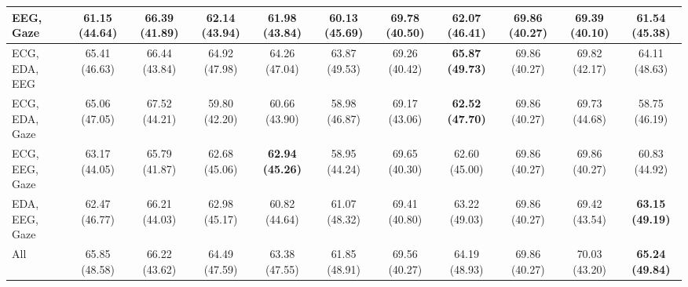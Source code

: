 \begin{table}[!htbp]
\begin{tabular}{lcccccccccc}
    EEG, Gaze & 61.15 (44.64) & 66.39 (41.89) & 62.14 (43.94) & 61.98 (43.84) & 60.13 (45.69) & 69.78 (40.50) & \textbf{62.07 (46.41)} & 69.86 (40.27) & 69.39 (40.10) & 61.54 (45.38) \\
    \midrule
    ECG, EDA, EEG & 65.41 (46.63) & 66.44 (43.84) & 64.92 (47.98) & 64.26 (47.04) & 63.87 (49.53) & 69.26 (40.42) & \textbf{65.87 (49.73)} & 69.86 (40.27) & 69.82 (42.17) & 64.11 (48.63) \\
    ECG, EDA, Gaze & 65.06 (47.05) & 67.52 (44.21) & 59.80 (42.20) & 60.66 (43.90) & 58.98 (46.87) & 69.17 (43.06) & \textbf{62.52 (47.70)} & 69.86 (40.27) & 69.73 (44.68) & 58.75 (46.19) \\
    ECG, EEG, Gaze & 63.17 (44.05) & 65.79 (41.87) & 62.68 (45.06) & \textbf{62.94 (45.26)} & 58.95 (44.24) & 69.65 (40.30) & 62.60 (45.00) & 69.86 (40.27) & 69.86 (40.27) & 60.83 (44.92) \\
    EDA, EEG, Gaze & 62.47 (46.77) & 66.21 (44.03) & 62.98 (45.17) & 60.82 (44.64) & 61.07 (48.32) & 69.41 (40.80) & 63.22 (49.03) & 69.86 (40.27) & 69.42 (43.54) & \textbf{63.15 (49.19)} \\
    \midrule
    All & 65.85 (48.58) & 66.22 (43.62) & 64.49 (47.59) & 63.38 (47.55) & 61.85 (48.91) & 69.56 (40.27) & 64.19 (48.93) & 69.86 (40.27) & 70.03 (43.20) & \textbf{65.24 (49.84)} \\
    \bottomrule
  \end{tabular}
\end{table}
